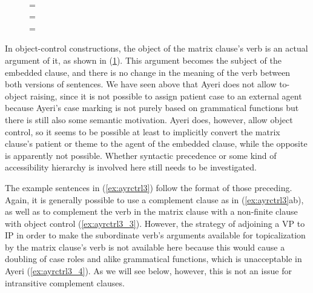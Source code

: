 \begin{figure}[h]
\pex\label{ex:engctrl2}
\a {}\\
	= 
\a {}\\
	= 
\a {}\\
	= 
\xe
\end{figure}

In object-control constructions, the object of the matrix clause's verb is an
actual argument of it, as shown in (\ref{ex:engctrl2}). This argument becomes
the subject of the embedded clause, and there is no change in the meaning of
the verb between both versions of sentences. We have seen above that Ayeri does
not allow to-object raising, since it is not possible to assign patient case to
an external agent because Ayeri's case marking is not purely based on
grammatical functions but there is still also some semantic motivation. Ayeri
does, however, allow object control, so it seems to be possible at least to
implicitly convert the matrix clause's patient or theme to the agent of the
embedded clause, while the opposite is apparently not possible. Whether
syntactic precedence or some kind of accessibility hierarchy is involved here
still needs to be investigated.

The example sentences in (\ref{ex:ayrctrl3}) follow the format of those
preceding. Again, it is generally possible to use a complement clause as in
(\ref{ex:ayrctrl3}ab), as well as to complement the verb in the matrix clause
with a non-finite clause with object control (\ref{ex:ayrctrl3_3}). However,
the strategy of adjoining a VP to IP in order to make the subordinate verb's
arguments available for topicalization by the matrix clause's verb is not
available here because this would cause a doubling of case roles and alike
grammatical functions, which is unacceptable in Ayeri (\ref{ex:ayrctrl3_4}).
As we will see below, however, this is not an issue for intransitive complement
clauses.

